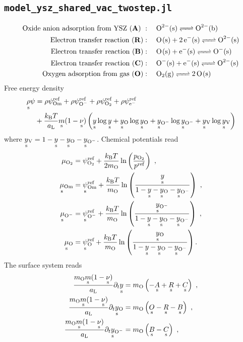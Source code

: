 \documentclass{article}
\numberwithin{equation}{section}
\newcommand{\us}[1]{\underset{\textrm{s}}{#1}{}}
\def\kB{k_\mathrm{B}}
\def\Ox{\mathrm{O}}
\newcommand{\Omin}{{\ce{O-}}}
\def\Om{\mathrm{Om}}
\newcommand{\OO}{{\ce{O2}}}
\def\eM{\mathrm{e^-}}
\def\aL{a_\mathrm{L}}
\def\ys{\us y}
\newcommand{\ysV}{\us y_{\textrm{V}}}
\newcommand{\yOmin}{\us y_{\ce{O-}}}
\def\yOs{\us y_\textrm{O}}
\def\REF{\textrm{ref}}
\begin{document}
\subsection{\texttt{model\_ysz\_shared\_vac\_twostep.jl}}
\begin{subequations}
 \begin{align}
\text{Oxide anion adsorption from YSZ (\textbf{A})}  \ &: \quad 
\ce{O^{2-}(s) <=> O^{2-}(b)}
\\
\text{Electron transfer reaction (\textbf{R})}   &: \quad 
\ce{O(s) +  2e^-(s) <=> O^{2-}(s)}
\\
\text{Electron transfer reaction (\textbf{B})}   &: \quad 
\ce{O(s) +  e^-(s) <=> O^{-}(s)}
\\
\text{Electron transfer reaction (\textbf{C})}  &: \quad 
\ce{O^-(s) +  e^-(s) <=> O^{2-}(s)}
\\
\text{Oxygen adsorption from gas (\textbf{O})}   &: \quad 
\ce{O2(g) <=> 2O(s)}
\end{align}
\end{subequations}
Free energy density
\begin{align}
    \us\rho\psi &= 
              \rho\psi^\REF_\Om
            + \rho\psi^\REF_\Omin
            + \rho\psi^\REF_\OO
            + \rho\psi^\REF_\eM\nonumber
            \\
            &+ \frac{\kB T}{\aL}\us m(1-\us\nu) 
            \left( 
                \ys   \log {\ys} 
                +\yOs  \log {\yOs}
                +\yOmin  \log {\yOmin}
                +\ysV  \log {\ysV}
            \right)
    \label{}
\end{align}
where $\ysV = 1 - \ys - \yOs - \yOmin$.
Chemical potentials read
\begin{subequations}
\begin{align}
\mu_{\OO} &= \psi_{\OO}^\REF + \frac{\kB T}{2 m_\Ox}\ln 
\left( 
    \frac{p_\OO}{p^\REF} 
\right)~,
\\
\us\mu_{\Om} 
&= 
\us \psi_{\Om}^\REF 
+ 
\frac{\kB T}{m_\Ox} \ln 
\left(  
	\frac{\ys}{1-\ys - \yOs- \yOmin}
\right)~,
\\
\us\mu_{\Omin} 
&= 
\us \psi_{\Omin}^\REF 
+ 
\frac{\kB T}{m_\Ox} \ln 
\left(  
	\frac{\yOmin}{1-\ys - \yOs - \yOmin}
\right)~,
\\
\us\mu_{\Ox} 
&= 
\us \psi_{\Ox}^\REF 
+ 
\frac{\kB T}{m_\Ox} \ln 
\left(  
	\frac{\yOs}{1-\ys - \yOs- \yOmin}
\right).
\end{align}
\end{subequations}
The surface system reads
\begin{subequations}
\begin{align}
 \frac{m_\Ox \us m (1- \us \nu)}{\aL}\partial_t \ys
&=
m_\Ox
\left(
    - \us A
    +\us R
    +\us C
\right)~,
\\
 \frac{m_\Ox \us m (1- \us \nu)}{\aL}\partial_t \yOs
&=
m_\Ox
\left(
      \us O
     -\us R 
     -\us B
\right)~,
\\
\frac{m_\Ox \us m (1- \us \nu)}{\aL}\partial_t \yOmin
&=
m_\Ox 
\left(
    \us B 
   -\us C
\right)~,
\end{align}
\end{subequations}
\end{document}
